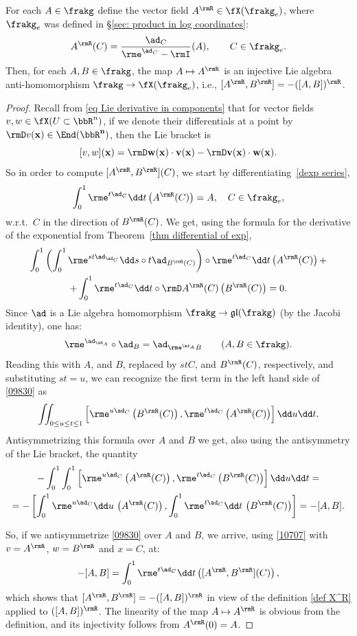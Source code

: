 \begin{lem}[{{\cite[Lem.~1.8.2]{DK}}}]\label{lem 1.8.2 DK}
    For each $A\in\frakg$ define the vector field $A^\rmR\in \fX(\frakg_e)$, where $\frakg_e$ was defined in \S\ref{sec: product in log coordinates}:
    \[ A^\rmR(C)=\frac{\ad_C}{\rme^{\ad_C}-\rmI}(A),\quad \quad C\in\frakg_e. \label{def X^R}\]
    Then, for each $A,B\in\frakg$, the map $A\mapsto A^\rmR$ is an injective Lie algebra anti-homomorphism $\frakg\to \fX(\frakg_e)$, i.e., $[A^\rmR,B^\rmR]=-([A,B])^\rmR$.
\end{lem}
\begin{proof}
    Recall from \eqref{eq Lie derivative in components} that for vector fields $v,w\in\fX(U\subset\bbR^n)$, if we denote their differentials at a point by $\rmD v(\bf x)\in \End(\bbR^n)$, then the Lie bracket is
    \[[v,w](\bf x)=\rmD w(\bf x)\cdot v(\bf x)-\rmD v(\bf x)\cdot w(\bf x).\label{10707}\]
    So in order to compute $[A^\rmR,B^\rmR](C)$, we start by differentiating~\eqref{dexp series},
    \[\int_0^1 \rme^{t\ad_C}\dd t \left(A^\rmR(C)\right)=A,\quad C\in\frakg_e,\]
   w.r.t.\ $C$ in the direction of $B^\rmR(C)$. We get, using the formula for the derivative of the exponential from Theorem~\ref{thm differential of exp}, 
    \begin{multline}
        \int_0^1 \left(\int_0^1\rme^{st\ad_{\ad_C}} \dd s\circ t\ad_{B^\rmR(C)}\right)\circ \rme^{t\ad_C}\dd t\left(A^\rmR(C)\right)+\\
        +\int_0^1\rme^{t\ad_C}\dd t\circ \rmD A^\rmR(C)\left(B^\rmR(C)\right)=0.\label{09830}
    \end{multline} 
    Since $\ad$ is a Lie algebra homomorphism $\frakg\to\mathfrak{gl}(\frakg)$ (by the Jacobi identity), one has:
    \[\rme^{\ad_{\ad_A}}\circ \ad_B=\ad_{\rme^{\ad_A} B}\quad \quad (A,B\in\frakg).\]
    Reading this with $A$, and $B$, replaced by $stC$, and $B^\rmR(C)$, respectively, and substituting $st=u$, we can recognize the first term in the left hand side of \eqref{09830} as
    \[\iint_{0\leq u\leq t\leq 1}\left[\rme^{u\ad_C}\left(B^\rmR(C)\right),\rme^{t\ad_C}\left(A^\rmR(C)\right)\right]\dd u\dd t.\]
    Antisymmetrizing this formula over $A$ and $B$  we get, also using the antisymmetry of the Lie bracket, the quantity
    \begin{multline}
        -\int_0^1\int_0^1\left[\rme^{u\ad_C}\left(A^\rmR(C)\right),\rme^{t\ad_C}\left(B^\rmR(C)\right)\right]\dd u\dd t=\\
        =-\left[\int_0^1\rme^{u\ad_C}\dd u\, \left(A^\rmR(C)\right),\int_0^1\rme^{t\ad_C}\dd t\, \left(B^\rmR(C)\right)\right]=-[A,B].
    \end{multline}

    So, if we antisymmetrize \eqref{09830} over $A$ and $B$, we arrive, using \eqref{10707} with $v=A^\rmR$, $w=B^\rmR$ and $x=C$, at:
    \[-[A,B]=\int_0^1 \rme^{t\ad_C}\dd t\left([A^\rmR,B^\rmR](C)\right),\]
    which shows that $[A^\rmR,B^\rmR]=-([A,B])^\rmR$ in view of the definition \eqref{def X^R} applied to $([A,B])^\rmR$. The linearity of the map $A\mapsto A^\rmR$ is obvious from the definition, and its injectivity follows from $A^\rmR(0)=A$.
\end{proof}
